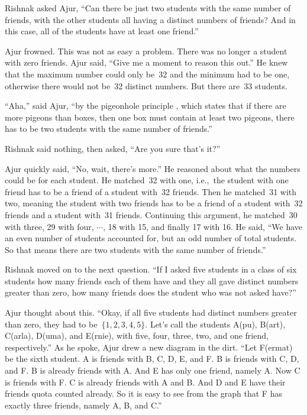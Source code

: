 Rishnak asked Ajur, ``Can there be just two students with the same number of friends, with the other students all having a distinct numbers of friends? And in this case, all of the students have at least one friend.''

Ajur frowned. This was not as easy a problem. There was no longer a student with zero friends. Ajur said, ``Give me a moment to reason this out.'' He knew that the maximum number could only be~32 and the minimum had to be one, otherwise there would not be~32 distinct numbers. But there are~33 students.

``Aha,'' said Ajur, ``by the pigeonhole principle , which states that if there are more pigeons than boxes, then one box must contain at least two pigeons, there has to be two students with the same number of friends.''

Rishnak said nothing, then asked, ``Are you sure that's it?''

Ajur quickly said, ``No, wait, there's more.''  He reasoned about what the numbers could be for each student. He matched~32 with one, i.e.,~the student with one friend has to be a friend of a student with~32 friends. Then he matched~31 with two, meaning the student with two friends has to be a friend of a student with~32 friends and a student with~31 friends. Continuing this argument, he matched~30 with three, 29 with four, $\cdots$, 18 with 15, and finally 17 with 16. He said, ``We have an even number of students accounted for, but an odd number of total students. So that means there are two students with the same number of friends.''

Rishnak moved on to the next question. ``If I asked five students in a class of six students how many friends each of them have and they all gave distinct numbers greater than zero, how many friends does the student who was not asked have?''

Ajur thought about this. ``Okay, if all five students had distinct numbers greater than zero, they had to be~$\{1,2,3,4,5\}$. Let's call the students A(pu), B(art), C(arla), D(uma), and E(rnie), with five, four, three, two, and one friend, respectively.''  As he spoke, Ajur drew a new diagram in the dirt. ``Let F(ermat) be the sixth student. A is friends with B, C, D, E, and F. B is friends with C, D, and F. B is already friends with A. And E has only one friend, namely A. Now C is friends with F. C is already friends with A and B. And D and E have their friends quota counted already. So it is easy to see from the graph that F has exactly three friends, namely A, B, and C.''

